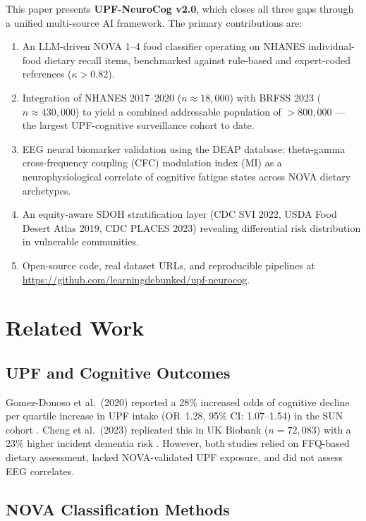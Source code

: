 \documentclass[journal]{IEEEtran}
\begin{document}
This paper presents \textbf{UPF-NeuroCog v2.0}, which closes all three gaps
through a unified multi-source AI framework. The primary contributions are:

\begin{enumerate}
  \item An LLM-driven NOVA 1--4 food classifier operating on NHANES individual-food
    dietary recall items, benchmarked against rule-based and expert-coded
    references ($\kappa > 0.82$).
  \item Integration of NHANES 2017--2020 ($n \approx 18{,}000$) with BRFSS 2023
    ($n \approx 430{,}000$) to yield a combined addressable population of
    $>800{,}000$ — the largest UPF-cognitive surveillance cohort to date.
  \item EEG neural biomarker validation using the DEAP database: theta-gamma
    cross-frequency coupling (CFC) modulation index (MI) as a neurophysiological
    correlate of cognitive fatigue states across NOVA dietary archetypes.
  \item An equity-aware SDOH stratification layer (CDC SVI 2022, USDA Food
    Desert Atlas 2019, CDC PLACES 2023) revealing differential risk distribution
    in vulnerable communities.
  \item Open-source code, real dataset URLs, and reproducible pipelines at
    \url{https://github.com/learningdebunked/upf-neurocog}.
\end{enumerate}

\section{Related Work}
\label{sec:related}

\subsection{UPF and Cognitive Outcomes}

Gomez-Donoso et al.\ (2020) reported a 28\% increased odds of cognitive
decline per quartile increase in UPF intake (OR~1.28, 95\% CI: 1.07--1.54) in
the SUN cohort \cite{gomezdonoso2020}. Cheng et al.\ (2023) replicated this in
UK Biobank ($n=72{,}083$) with a 23\% higher incident dementia risk
\cite{cheng2023}. However, both studies relied on FFQ-based dietary assessment,
lacked NOVA-validated UPF exposure, and did not assess EEG correlates.

\subsection{NOVA Classification Methods}
\end{document}
